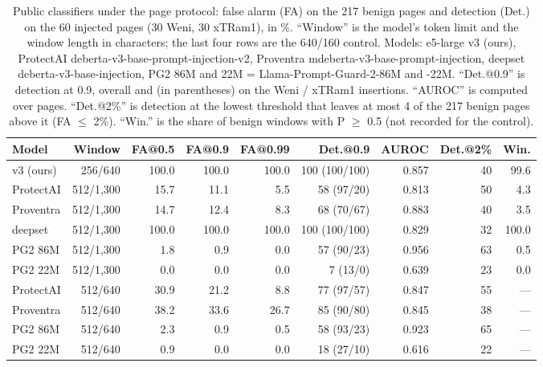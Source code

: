 \documentclass[11pt]{article}
\begin{document}
\begin{table}[tbp]
\centering
\small
\caption{Public classifiers under the page protocol: false alarm (FA) on the 217 benign pages and detection (Det.) on the 60 injected pages (30 Weni, 30 xTRam1), in \%. ``Window'' is the model's token limit and the window length in characters; the last four rows are the 640/160 control. Models: e5-large v3 (ours), ProtectAI deberta-v3-base-prompt-injection-v2, Proventra mdeberta-v3-base-prompt-injection, deepset deberta-v3-base-injection, PG2 86M and 22M = Llama-Prompt-Guard-2-86M and -22M. ``Det.@0.9'' is detection at 0.9, overall and (in parentheses) on the Weni / xTRam1 insertions. ``AUROC'' is computed over pages. ``Det.@2\%'' is detection at the lowest threshold that leaves at most 4 of the 217 benign pages above it (FA \ensuremath{\leq} 2\%). ``Win.'' is the share of benign windows with P \ensuremath{\geq} 0.5 (not recorded for the control).}\label{tab:8}
\begin{tabular}{@{}lrrrrrrrr@{}}
\toprule
Model & Window & FA@0.5 & FA@0.9 & FA@0.99 & Det.@0.9 & AUROC & Det.@2\% & Win. \\
\midrule
v3 (ours) & 256/640 & 100.0 & 100.0 & 100.0 & 100 (100/100) & 0.857 & 40 & 99.6 %
 \\
ProtectAI & 512/1,300 & 15.7 & 11.1 & 5.5 & 58 (97/20) & 0.813 & 50 & 4.3 %
 \\
Proventra & 512/1,300 & 14.7 & 12.4 & 8.3 & 68 (70/67) & 0.883 & 40 & 3.5 %
 \\
deepset & 512/1,300 & 100.0 & 100.0 & 100.0 & 100 (100/100) & 0.829 & 32 & 100.0 %
 \\
PG2 86M & 512/1,300 & 1.8 & 0.9 & 0.0 & 57 (90/23) & 0.956 & 63 & 0.5 %
 \\
PG2 22M & 512/1,300 & 0.0 & 0.0 & 0.0 & 7 (13/0) & 0.639 & 23 & 0.0 %
 \\
ProtectAI & 512/640 & 30.9 & 21.2 & 8.8 & 77 (97/57) & 0.847 & 55 & — %
 \\
Proventra & 512/640 & 38.2 & 33.6 & 26.7 & 85 (90/80) & 0.845 & 38 & — %
 \\
PG2 86M & 512/640 & 2.3 & 0.9 & 0.5 & 58 (93/23) & 0.923 & 65 & — %
 \\
PG2 22M & 512/640 & 0.9 & 0.0 & 0.0 & 18 (27/10) & 0.616 & 22 & — %
 \\
\bottomrule
\end{tabular}
\end{table}
\end{document}
